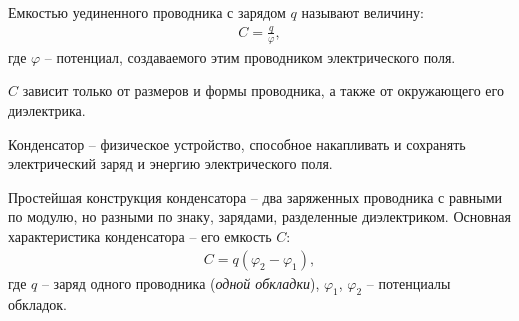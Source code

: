 \documentclass[__main__.tex]{subfiles}
\begin{document}
\begin{definition}
    Емкостью уединенного проводника с зарядом $q$ называют величину:
    \begin{gather}
        C=\frac{q}{\varphi},
    \end{gather}
    где $\varphi$ -- потенциал, создаваемого этим проводником электрического поля.
\end{definition}
$C$ зависит только от размеров и формы проводника, а также от окружающего его диэлектрика.

\begin{definition}
    Конденсатор -- физическое устройство, способное накапливать и сохранять электрический заряд и энергию электрического поля.
\end{definition}
Простейшая конструкция конденсатора -- два заряженных проводника с равными по модулю, но разными по знаку, зарядами, разделенные диэлектриком. Основная характеристика конденсатора -- его емкость $C$:
\begin{gather}
    C=q(\varphi_2-\varphi_1),
\end{gather}
где $q$ -- заряд одного проводника (\emph{одной обкладки}), $\varphi_1$, $\varphi_2$ -- потенциалы обкладок.
\end{document}
